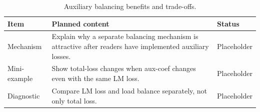 \begin{table}[H]
\centering
\caption{Auxiliary balancing benefits and trade-offs.}
\label{tab:ch09-the-limitation-of-auxiliary-balancing}
\begin{tabularx}{\textwidth}{p{}X p{}}
\toprule
Item & Planned content & Status \\
\midrule
Mechanism & Explain why a separate balancing mechanism is attractive after readers have implemented auxiliary losses. & Placeholder \\
Mini-example & Show total-loss changes when aux-coef changes even with the same LM loss. & Placeholder \\
Diagnostic & Compare LM loss and load balance separately, not only total loss. & Placeholder \\
\bottomrule
\end{tabularx}
\end{table}

